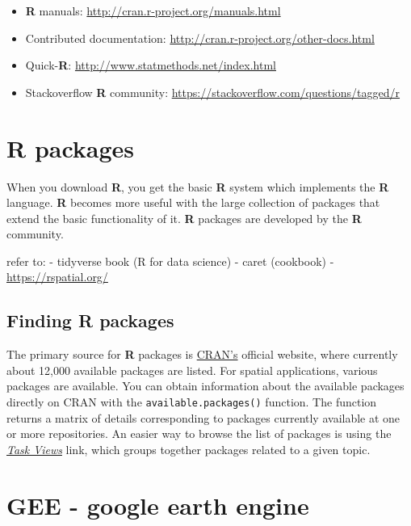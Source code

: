 \documentclass[
  10pt,
  b5paper,
  oneside]{book}
\providecommand{\tightlist}{%
  \setlength{\itemsep}{0pt}\setlength{\parskip}{0pt}}
\begin{document}
\begin{itemize}
\tightlist
\item
  \textbf{R} manuals: \url{http://cran.r-project.org/manuals.html}
\item
  Contributed documentation: \url{http://cran.r-project.org/other-docs.html}
\item
  Quick-\textbf{R}: \url{http://www.statmethods.net/index.html}
\item
  Stackoverflow \textbf{R} community: \url{https://stackoverflow.com/questions/tagged/r}
\end{itemize}

\hypertarget{r-packages}{%
\section{R packages}\label{r-packages}}

When you download \textbf{R}, you get the basic \textbf{R} system which implements the \textbf{R} language. \textbf{R} becomes more useful with the large collection of packages that extend the basic functionality of it. \textbf{R} packages are developed by the \textbf{R} community.

refer to:
- tidyverse book (R for data science)
- caret (cookbook)
- \url{https://rspatial.org/}

\hypertarget{finding-r-packages}{%
\subsection{Finding R packages}\label{finding-r-packages}}

The primary source for \textbf{R} packages is \href{https://cran.r-project.org/}{CRAN's} official website, where currently about 12,000 available packages are listed. For spatial applications, various packages are available. You can obtain information about the available packages directly on CRAN with the \texttt{available.packages()} function. The function returns a matrix of details corresponding to packages currently available at one or more repositories. An easier way to browse the list of packages is using the \href{https://cran.r-project.org/web/views/}{\emph{Task Views}} link, which groups together packages related to a given topic.

\hypertarget{gee---google-earth-engine}{%
\section{GEE - google earth engine}\label{gee---google-earth-engine}}
\end{document}
